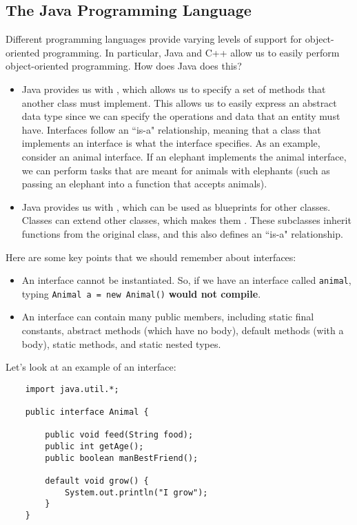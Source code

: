 \subsection{The Java Programming Language}
Different programming languages provide varying levels of support for object-oriented programming. In particular, Java and C++ allow us to easily perform object-oriented programming. How does Java does this?
\begin{itemize}
    \item Java provides us with , which allows us to specify a set of methods that another class must implement. This allows us to easily express an abstract data type since we can specify the operations and data that an entity must have. Interfaces follow an ``is-a" relationship, meaning that a class that implements an interface is what the interface specifies. As an example, consider an animal interface. If an elephant implements the animal interface, we can perform tasks that are meant for animals with elephants (such as passing an elephant into a function that accepts animals). 
    \item Java provides us with , which can be used as blueprints for other classes. Classes can extend other classes, which makes them . These subclasses inherit functions from the original class, and this also defines an ``is-a" relationship. 
\end{itemize}

Here are some key points that we should remember about interfaces:
\begin{itemize}
    \item An interface cannot be instantiated. So, if we have an interface called \verb!animal!, typing \verb!Animal a = new Animal()! \textbf{would not compile}.
    \item An interface can contain many public members, including static final constants, abstract methods (which have no body), default methods (with a body), static methods, and static nested types.
\end{itemize}

Let's look at an example of an interface:

\begin{lstlisting}
    import java.util.*;

    public interface Animal {
        
        public void feed(String food);
        public int getAge();
        public boolean manBestFriend();
        
        default void grow() {
            System.out.println("I grow");
        }
    }
\end{lstlisting}

